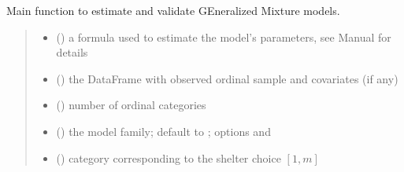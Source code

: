 \documentclass[letterpaper,10pt,english]{sphinxmanual}
\begin{document}
\begin{fulllineitems}
\label{\detokenize{cubmods:cubmods.gem.estimate}}
\pysigstartsignatures
{}
\pysigstopsignatures
\sphinxAtStartPar
Main function to estimate and validate GEneralized Mixture models.
\begin{quote}\begin{description}
\begin{itemize}
\item {} 
\sphinxAtStartPar
{} () \textendash{} a formula used to estimate the model’s parameters, see
Manual for details

\item {} 
\sphinxAtStartPar
{} () \textendash{} the DataFrame with observed ordinal sample and covariates (if any)

\item {} 
\sphinxAtStartPar
{} () \textendash{} number of ordinal categories

\item {} 
\sphinxAtStartPar
{} () \textendash{} the model family; default to ; options  and 

\item {} 
\sphinxAtStartPar
{} () \textendash{} category corresponding to the shelter choice \([1,m]\)


\end{itemize}
\end{description}
\end{quote}
\end{fulllineitems}
\end{document}
